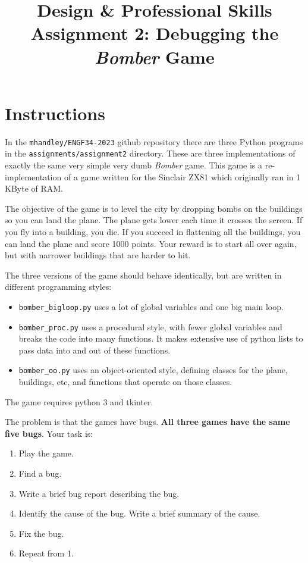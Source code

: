 \documentclass{article}
\title{Design \& Professional Skills\\
  Assignment 2: Debugging the {\em Bomber} Game}
\author{}
\date{}
\begin{document}
\maketitle

\section*{Instructions}

In the {\tt mhandley/ENGF34-2023} github repository there are three
Python programs in the {\tt assignments/assignment2} directory.  These
are three implementations of exactly the same very simple very dumb
{\em Bomber} game. This game is a re-implementation of a game written for
the Sinclair ZX81 which originally ran in 1 KByte of RAM.

The objective of the game is to level the city by dropping bombs on
the buildings so you can land the plane.  The plane gets lower each
time it crosses the screen.  If you fly into a building, you die.  If
you succeed in flattening all the buildings, you can land the plane
and score 1000 points.  Your reward is to start all over again, but
with narrower buildings that are harder to hit.  

The three versions of the game should behave identically, but are written in different programming styles:
\begin{itemize}
\item {\tt bomber\_bigloop.py} uses a lot of global variables and one big main loop.
\item{\tt bomber\_proc.py} uses a procedural style, with fewer global variables and breaks the code into many functions.  It makes extensive use of python lists to pass data into and out of these functions.
\item{\tt bomber\_oo.py} uses an object-oriented style, defining classes for the plane, buildings, etc, and functions that operate on those classes.
\end{itemize}
The game requires python 3 and tkinter.

The problem is that the games have bugs.  \textbf{All three games have the same five bugs}.  Your task is:
\begin{enumerate}
\item Play the game.
\item Find a bug.
\item Write a brief bug report describing the bug.
\item Identify the cause of the bug.  Write a brief summary of the cause.
\item Fix the bug.
\item Repeat from 1.
\end{enumerate}
\end{document}
